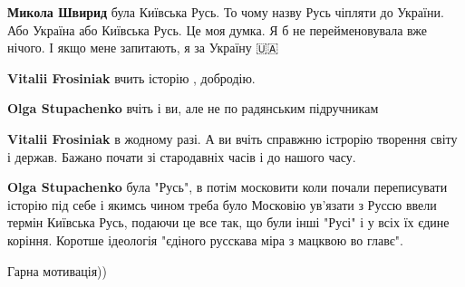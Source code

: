 \begin{itemize}
\begin{itemize}
\textbf{Микола Швирид} була Київська Русь. То чому назву Русь чіпляти до України.
Або Україна або Київська Русь. Це моя думка.
Я б не перейменовувала вже нічого. І якщо мене запитають, я за Україну 🇺🇦

 
\textbf{Vitalii Frosiniak} вчить історію , добродію.

 
\textbf{Olga Stupachenko} вчіть і ви, але не по радянським підручникам

 
\textbf{Vitalii Frosiniak} в жодному разі. А ви вчіть справжню істрорію творення світу і держав. Бажано почати зі стародавніх часів і до нашого часу.

 
\textbf{Olga Stupachenko} була "Русь", в потім московити коли почали переписувати історію під себе і якимсь чином треба було Московію ув'язати з Руссю ввели термін Київська Русь, подаючи це все так, що були інші "Русі" і у всіх їх єдине коріння.
Коротше ідеологія "єдіного русскава міра з мацквою во главє".
\end{itemize}

 
Гарна мотивація))


\end{itemize}
